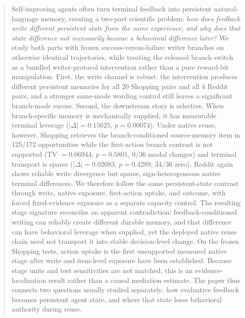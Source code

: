 \begin{abstract}
Self-improving agents often turn terminal feedback into persistent natural-language memory, creating a two-part scientific problem: \emph{how does feedback write different persistent state from the same experience, and why does that state difference not necessarily become a behavioral difference later?} We study both parts with frozen success-versus-failure writer branches on otherwise identical trajectories, while treating the released branch switch as a bundled writer-protocol intervention rather than a pure reward-bit manipulation. First, the write channel is robust: the intervention produces different persistent memories for all 20 Shopping pairs and all 4 Reddit pairs, and a stronger same-mode wording control still leaves a significant branch-mode excess. Second, the downstream story is selective. When branch-specific memory is mechanically supplied, it has measurable terminal leverage ($|\Delta|=0.15625$, $p=0.00074$). Under native reuse, however, Shopping retrieves the branch-conditioned source-memory item in 125/172 opportunities while the first-action branch contrast is not supported (TV $=0.06944$, $p=0.5801$, 0/36 modal changes) and terminal transport is sparse ($|\Delta|=0.02083$, $p=0.4289$, 34/36 zero). Reddit again shows reliable write divergence but sparse, sign-heterogeneous native terminal differences. We therefore follow the same persistent-state contrast through write, native exposure, first-action uptake, and outcome, with forced fixed-evidence exposure as a separate capacity control. The resulting stage signature reconciles an apparent contradiction: feedback-conditioned writing can reliably create different durable memory, and that difference can have behavioral leverage when supplied, yet the deployed native reuse chain need not transport it into stable decision-level change. On the frozen Shopping tests, action uptake is the first unsupported measured native stage after write and item-level exposure have been established. Because stage units and test sensitivities are not matched, this is an evidence-localization result rather than a causal mediation estimate. The paper thus connects two questions usually studied separately: how evaluative feedback becomes persistent agent state, and where that state loses behavioral authority during reuse.
\end{abstract}
